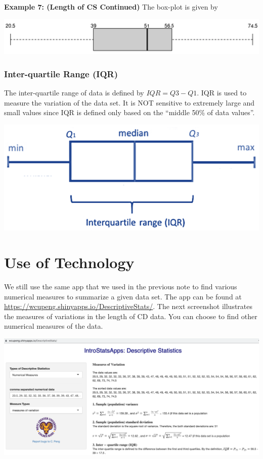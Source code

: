 \documentclass[
]{book}
\begin{document}
\textbf{Example 7: (Length of CS Continued)} The box-plot is given by

\begin{center}\includegraphics[width=0.7\linewidth]{week02/boxPlotExample} \end{center}

\hypertarget{inter-quartile-range-iqr}{%
\subsubsection{Inter-quartile Range (IQR)}\label{inter-quartile-range-iqr}}

The inter-quartile range of data is defined by \(IQR = Q3 - Q1\). IQR is used to measure the variation of the data set. It is NOT sensitive to extremely large and small values since IQR is defined only based on the ``middle 50\% of data values''.

\begin{center}\includegraphics[width=0.55\linewidth]{week02/IQR} \end{center}

\hfill\break

\hypertarget{use-of-technology-1}{%
\section{Use of Technology}\label{use-of-technology-1}}

We still use the same app that we used in the previous note to find various numerical measures to summarize a given data set. The app can be found at \url{https://wcupeng.shinyapps.io/DescriptiveStats/}. The next screenshot illustrates the measures of variations in the length of CD data. You can choose to find other numerical measures of the data.

\begin{center}\includegraphics[width=0.95\linewidth]{week02/techSpread} \end{center}
\end{document}
